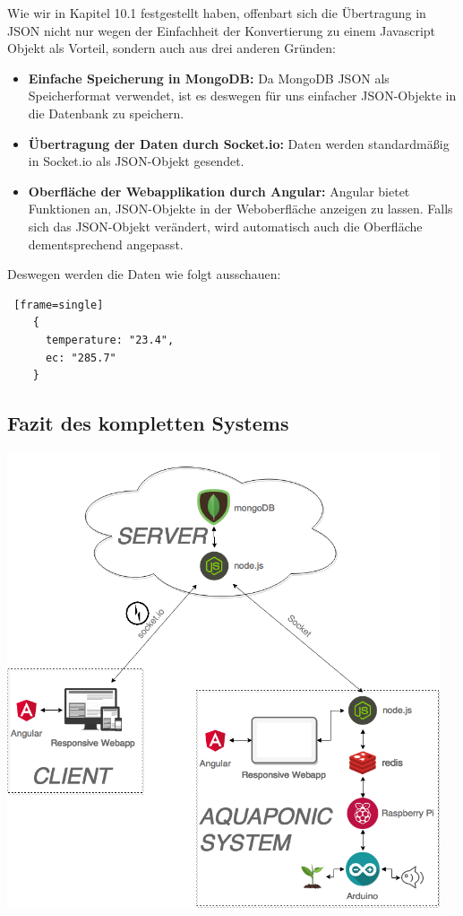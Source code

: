 Wie wir in Kapitel 10.1 festgestellt haben, offenbart sich die \"Ubertragung in JSON nicht nur wegen der Einfachheit der Konvertierung zu einem Javascript Objekt als Vorteil, sondern auch aus drei anderen Gr\"unden:
\begin{itemize}
    \item \textbf{Einfache Speicherung in MongoDB:} Da MongoDB JSON als Speicherformat verwendet, ist es deswegen f\"ur uns einfacher JSON-Objekte in die Datenbank zu speichern.
    \item \textbf{\"Ubertragung der Daten durch Socket.io:} Daten werden standardm\"a{\ss}ig in Socket.io als JSON-Objekt gesendet.
    \item \textbf{Oberfl\"ache der Webapplikation durch Angular:} Angular bietet Funktionen an, JSON-Objekte in der Weboberfl\"ache anzeigen zu lassen. Falls sich das JSON-Objekt ver\"andert, wird automatisch auch die Oberfl\"ache dementsprechend angepasst.
\end{itemize}

Deswegen werden die Daten wie folgt ausschauen:
\begin{lstlisting} [frame=single]
	{
	  temperature: "23.4",
	  ec: "285.7"
	}
\end{lstlisting}
\newpage
\subsection{Fazit des kompletten Systems}
\includegraphics[height=5.3in]{images/complete_system}
